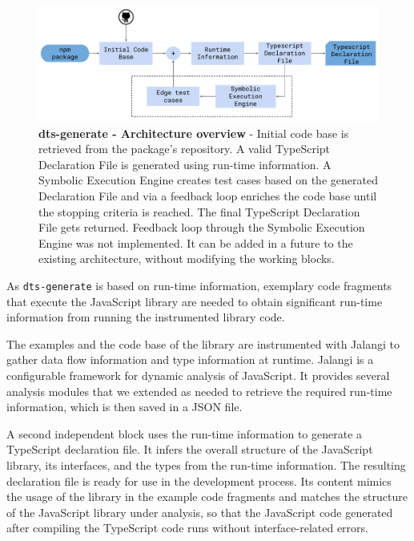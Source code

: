 \documentclass[a4paper,english,cleveref, autoref]{lipics-v2019}
\begin{document}
\begin{figure}[tp]
    \centering
    \includegraphics[width=1\linewidth]{dts-generate-block-diagram.pdf}
    \caption[dts-generate - Architecture overview]{\textbf{dts-generate - Architecture overview} - Initial code base is retrieved from the \NPM{} package's repository. A valid TypeScript Declaration File is generated using run-time information. A Symbolic Execution Engine creates test cases based on the generated Declaration File and via a feedback loop enriches the code base until the stopping criteria is reached. The final TypeScript Declaration File gets returned. Feedback loop through the Symbolic Execution Engine was not implemented. It can be added in a future to the existing architecture, without modifying the working blocks.}
    \label{fig:tsd_generation_method_block_diagram}
  \end{figure}

As \texttt{dts-generate} is based on run-time information, 
exemplary code fragments that execute the JavaScript library are
needed to obtain 
significant run-time information from running the instrumented library
code.


The examples and the code base of the library are instrumented with
Jalangi \cite{DBLP:conf/sigsoft/SenKBG13} to gather data flow
information and type information at runtime. Jalangi is a configurable
framework for dynamic analysis of JavaScript. It provides several
analysis modules that we extended as needed to retrieve the required
run-time information, which is then saved in a JSON file. 

A second independent block uses the run-time information to generate a
TypeScript declaration file. It infers the overall structure of the JavaScript
library, its interfaces, and the types from the run-time information. 
The resulting declaration file is ready for use in the development
process. Its content mimics the usage of the library in the example
code fragments and matches the structure of the
JavaScript library under analysis, so that the JavaScript code
generated after compiling the TypeScript code runs without
interface-related errors.
\end{document}

